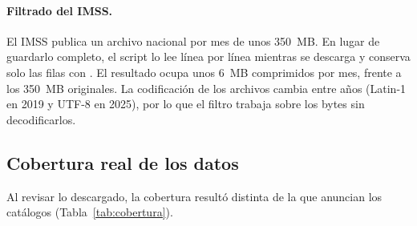 \paragraph{Filtrado del IMSS.} El IMSS publica un archivo nacional por mes de unos 350~MB. En lugar
de guardarlo completo, el script lo lee línea por línea mientras se descarga y conserva solo las
filas con . El resultado ocupa unos 6~MB comprimidos por mes, frente a los
350~MB originales. La codificación de los archivos cambia entre años (Latin-1 en 2019 y UTF-8 en
2025), por lo que el filtro trabaja sobre los bytes sin decodificarlos.

\subsection{Cobertura real de los datos}
Al revisar lo descargado, la cobertura resultó distinta de la que anuncian los catálogos
(Tabla~\ref{tab:cobertura}).

